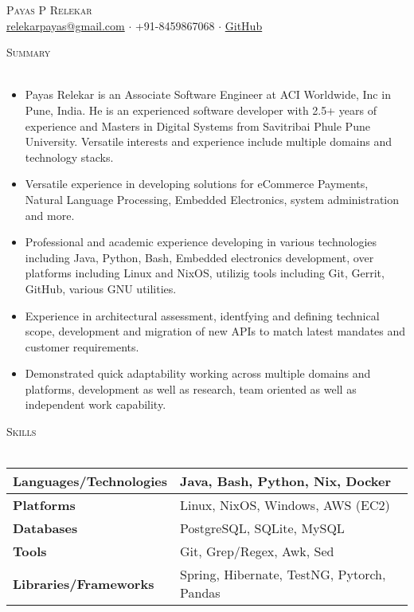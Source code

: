 \documentclass[a4paper]{article}
\newcommand{\lineunder} {
    \vspace*{-8pt} \\
    \hspace*{-18pt} \hrulefill \\
}
\newcommand{\header} [1] {
    {\hspace*{-18pt}\vspace*{6pt} \textsc{#1}}
    \vspace*{-6pt} \lineunder
}
\begin{document}
\vspace*{-40pt}

\vspace*{-10pt}
\begin{center}
	{\Huge \scshape {Payas P Relekar}}\\
	\href{mailto:relekarpayas@gmail.com}{relekarpayas@gmail.com} $\cdot$ +91-8459867068 $\cdot$ \href{https://github.com/remedialchaos/}{GitHub}\\
\end{center}

\header{Summary}
\vspace{1mm}

\begin{itemize} \itemsep 1pt
  \item Payas Relekar is an Associate Software Engineer at ACI Worldwide, Inc in Pune, India. He is an experienced software developer with 2.5+ years of experience and Masters in Digital Systems from Savitribai Phule Pune University. Versatile interests and experience include multiple domains and technology stacks.
  \item Versatile experience in developing solutions for eCommerce Payments, Natural Language Processing, Embedded Electronics, system administration and more.
  \item Professional and academic experience developing in various technologies including Java, Python, Bash, Embedded electronics development, over platforms including Linux and NixOS, utilizig tools including Git, Gerrit, GitHub, various GNU utilities.
  \item Experience in architectural assessment, identfying and defining technical scope, development and migration of new APIs to match latest mandates and customer requirements.
  \item Demonstrated quick adaptability working across multiple domains and platforms, development as well as research, team oriented as well as independent work capability.
\end{itemize}

\header{Skills}
\vspace{1mm}
\bgroup
\setlength{\arrayrulewidth}{0.2mm}
\def\arraystretch{1.5}
{\renewcommand{\arraystretch}{1.2}}
\begin{tabularx}{\textwidth}{ | X | X | }
  \hline
	\textbf{Languages/Technologies} & Java, Bash, Python, Nix, Docker        \\
  \hline
	\textbf{Platforms}             & Linux, NixOS, Windows, AWS (EC2)          \\
  \hline
	\textbf{Databases}             & PostgreSQL, SQLite, MySQL             \\
  \hline
	\textbf{Tools}                 & Git, Grep/Regex, Awk, Sed            \\
  \hline
	\textbf{Libraries/Frameworks}  & Spring, Hibernate, TestNG, Pytorch, Pandas \\
  \hline
\end{tabularx}
\egroup
\vspace{2mm}
\end{document}
